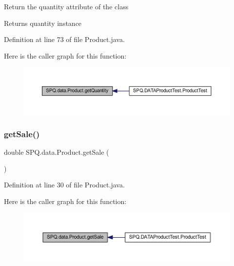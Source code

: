 Return the quantity attribute of the class \begin{DoxyReturn}{Returns}
quantity instance 
\end{DoxyReturn}


Definition at line 73 of file Product.\+java.

Here is the caller graph for this function\+:\nopagebreak
\begin{figure}[H]
\begin{center}
\leavevmode
\includegraphics[width=350pt]{class_s_p_q_1_1data_1_1_product_a1bcbc2a00b31563677cea1ab4cb8095c_icgraph}
\end{center}
\end{figure}
\mbox{\label{class_s_p_q_1_1data_1_1_product_a07ba2dea61bb96215609776cc4d7058d}} 
\subsubsection{\texorpdfstring{get\+Sale()}{getSale()}\hspace{0.1cm}{\footnotesize\ttfamily [1/2]}}
{\footnotesize\ttfamily double S\+P\+Q.\+data.\+Product.\+get\+Sale (\begin{DoxyParamCaption}{ }\end{DoxyParamCaption})}



Definition at line 30 of file Product.\+java.

Here is the caller graph for this function\+:\nopagebreak
\begin{figure}[H]
\begin{center}
\leavevmode
\includegraphics[width=350pt]{class_s_p_q_1_1data_1_1_product_a07ba2dea61bb96215609776cc4d7058d_icgraph}
\end{center}
\end{figure}
\mbox{\label{class_s_p_q_1_1data_1_1_product_a07ba2dea61bb96215609776cc4d7058d}} 

